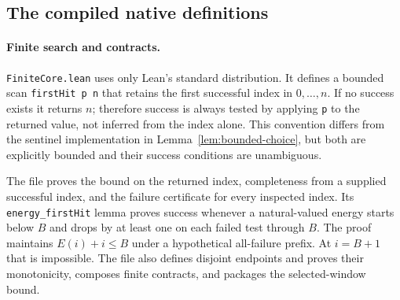 \subsection{The compiled native definitions}

\paragraph{Finite search and contracts.}
\texttt{FiniteCore.lean} uses only Lean's standard distribution. It defines
a bounded scan \texttt{firstHit p n} that retains the first successful
index in $0,\ldots,n$. If no success exists it returns $n$; therefore
success is always tested by applying \texttt{p} to the returned value,
not inferred from the index alone. This convention differs from the
sentinel implementation in Lemma~\ref{lem:bounded-choice}, but both
are explicitly bounded and their success conditions are unambiguous.

The file proves the bound on the returned index, completeness from a
supplied successful index, and the failure certificate for every
inspected index. Its \texttt{energy\_firstHit} lemma proves success
whenever a natural-valued energy starts below $B$ and drops by at least
one on each failed test through $B$. The proof maintains
$E(i)+i\le B$ under a hypothetical all-failure prefix. At $i=B+1$
that is impossible. The file also defines disjoint endpoints and
proves their monotonicity, composes finite contracts, and packages the
selected-window bound.

